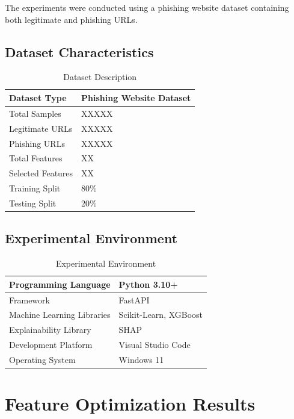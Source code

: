 \documentclass[12pt]{report}
\begin{document}
The experiments were conducted using a phishing website dataset containing both legitimate and phishing URLs.

\subsection{Dataset Characteristics}

\begin{table}[H]
\centering
\caption{Dataset Description}
\begin{tabular}{|l|l|}
\hline
Dataset Type & Phishing Website Dataset \\
\hline
Total Samples & XXXXX \\
\hline
Legitimate URLs & XXXXX \\
\hline
Phishing URLs & XXXXX \\
\hline
Total Features & XX \\
\hline
Selected Features & XX \\
\hline
Training Split & 80\% \\
\hline
Testing Split & 20\% \\
\hline
\end{tabular}
\end{table}

\subsection{Experimental Environment}

\begin{table}[H]
\centering
\caption{Experimental Environment}
\begin{tabular}{|l|l|}
\hline
Programming Language & Python 3.10+ \\
\hline
Framework & FastAPI \\
\hline
Machine Learning Libraries & Scikit-Learn, XGBoost \\
\hline
Explainability Library & SHAP \\
\hline
Development Platform & Visual Studio Code \\
\hline
Operating System & Windows 11 \\
\hline
\end{tabular}
\end{table}

\section{Feature Optimization Results}
\end{document}
